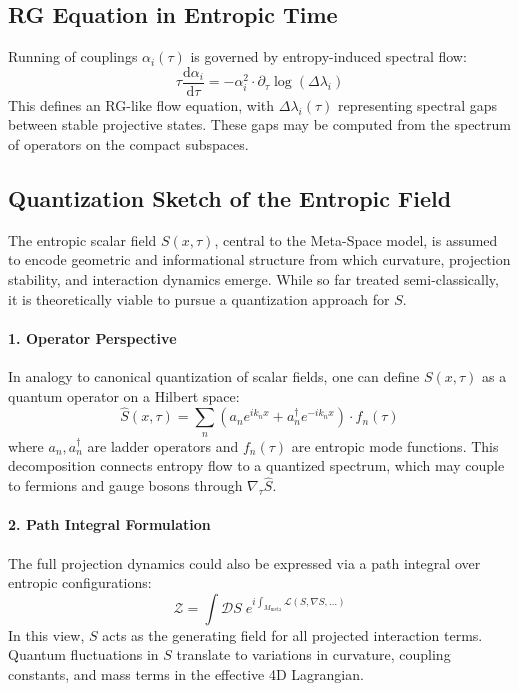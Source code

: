 \documentclass[10.5pt,a4paper]{article}
\begin{document}
\subsection{RG Equation in Entropic Time}
Running of couplings \( \alpha_i(\tau) \) is governed by entropy-induced spectral flow:
\[
\tau \frac{\mathrm{d}\alpha_i}{\mathrm{d}\tau} = -\alpha_i^2 \cdot \partial_\tau \log(\Delta\lambda_i)
\]
This defines an RG-like flow equation, with \( \Delta\lambda_i(\tau) \) representing spectral gaps between stable projective states.
These gaps may be computed from the spectrum of operators on the compact subspaces.

\subsection{Quantization Sketch of the Entropic Field}
The entropic scalar field \( S(x, \tau) \), central to the Meta-Space model, is assumed to encode geometric and informational structure
from which curvature, projection stability, and interaction dynamics emerge. While so far treated semi-classically, it is
theoretically viable to pursue a quantization approach for \( S \).

\paragraph{1. Operator Perspective}
In analogy to canonical quantization of scalar fields, one can define \( S(x, \tau) \) as a quantum operator on a Hilbert space:
\[
\hat{S}(x, \tau) = \sum_n \left( a_n e^{i k_n x} + a_n^\dagger e^{-i k_n x} \right) \cdot f_n(\tau)
\]
where \( a_n, a_n^\dagger \) are ladder operators and \( f_n(\tau) \) are entropic mode functions. This decomposition connects
entropy flow to a quantized spectrum, which may couple to fermions and gauge bosons through \( \nabla_\tau \hat{S} \).

\paragraph{2. Path Integral Formulation}
The full projection dynamics could also be expressed via a path integral over entropic configurations:
\[
\mathcal{Z} = \int \mathcal{D}S \; e^{i \int_{M_{\text{meta}}} \mathcal{L}(S, \nabla S, \ldots)}
\]
In this view, \( S \) acts as the generating field for all projected interaction terms. Quantum fluctuations in \( S \) translate to variations
in curvature, coupling constants, and mass terms in the effective 4D Lagrangian.
\end{document}
